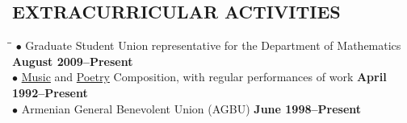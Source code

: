 \documentclass{resume}
\begin{document}
\begin{resume}
	\section{EXTRACURRICULAR ACTIVITIES}
	\vspace{-0.1in}
	\begin{tabbing}
\hspace{2.3in}\= \hspace{2.6in}\= \kill
$\bullet$ Graduate Student Union representative for the Department of Mathematics \>\>\textbf{August 2009--Present}\\
    $\bullet$ \href{http://davidkarapetyan.com/music.php}{Music} and
    \href{http://davidkarapetyan.com/poetry.php}{Poetry} Composition, with regular
    performances of work \>\> \textbf{April 1992--Present}\\
    $\bullet$ Armenian General Benevolent Union (AGBU) \>\> \textbf{June 1998--Present}\\
      \end{tabbing}

\end{resume}
\end{document}
